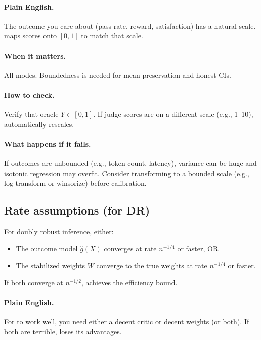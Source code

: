 \paragraph{Plain English.} The outcome you care about (pass rate, reward, satisfaction) has a natural scale. \autocal{} maps scores onto $[0, 1]$ to match that scale.

\paragraph{When it matters.} All modes. Boundedness is needed for mean preservation and honest CIs.

\paragraph{How to check.} Verify that oracle $Y \in [0, 1]$. If judge scores are on a different scale (e.g., 1--10), \autocal{} automatically rescales.

\paragraph{What happens if it fails.} If outcomes are unbounded (e.g., token count, latency), variance can be huge and isotonic regression may overfit. Consider transforming to a bounded scale (e.g., log-transform or winsorize) before calibration.

\subsection{Rate assumptions (for DR)}

\begin{assumption}
\label{assum:rates}
For doubly robust inference, either:
\begin{itemize}
\item The outcome model $\hat{g}(X)$ converges at rate $n^{-1/4}$ or faster, OR
\item The stabilized weights $W$ converge to the true weights at rate $n^{-1/4}$ or faster.
\end{itemize}
If both converge at $n^{-1/2}$, \dr{} achieves the efficiency bound.
\end{assumption}

\paragraph{Plain English.} For \dr{} to work well, you need either a decent critic or decent weights (or both). If both are terrible, \dr{} loses its advantages.


